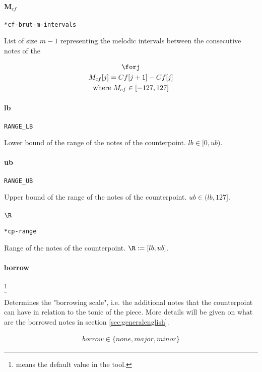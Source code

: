 \paragraph{M$_{cf}$} \texttt{*cf-brut-m-intervals}

List of size $m-1$ representing the melodic intervals between the consecutive notes of the \cfdot

\begin{equation}
    \begin{gathered}
        \forj\\
        M_{cf}[j]=Cf[j+1]-Cf[j]\\
        \text{where } M_{cf} \in [-127, 127]
    \end{gathered}
\end{equation}

\paragraph{lb} \texttt{RANGE\_LB}

Lower bound of the range of the notes of the counterpoint. $lb \in [0, ub)$.

\paragraph{ub} \texttt{RANGE\_UB}

Upper bound of the range of the notes of the counterpoint. $ub \in (lb, 127]$.

\paragraph{$\R$} \texttt{*cp-range}

Range of the notes of the counterpoint. $\R := [lb, ub]$.

\paragraph{borrow} \footnote{ means the default value in the tool.}

Determines the "borrowing scale", i.e. the additional notes that the counterpoint can have in relation to the tonic of the piece. More details will be given on what are the borrowed notes in section \ref{sec:generalenglish}.

\begin{equation}
    \begin{gathered}
        borrow \in \{none, major, minor\}
    \end{gathered}
\end{equation}

